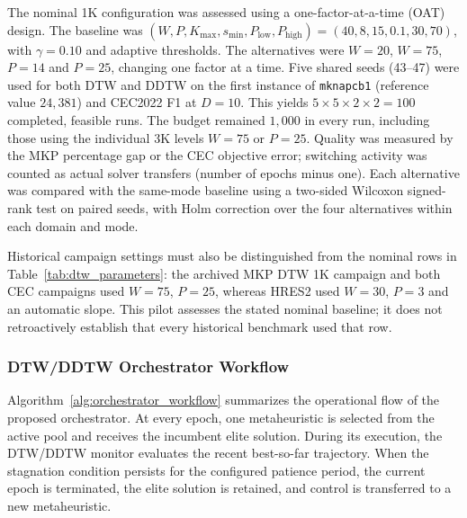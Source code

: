 \documentclass[review]{elsarticle}
\begin{document}
The nominal 1K configuration was assessed using a one-factor-at-a-time
(OAT) design. The baseline was
$(W,P,K_{\max},s_{\min},P_{\mathrm{low}},P_{\mathrm{high}})
=(40,8,15,0.1,30,70)$, with $\gamma=0.10$ and adaptive thresholds.
The alternatives were $W=20$, $W=75$, $P=14$ and $P=25$, changing one
factor at a time. Five shared seeds (43--47) were used for both DTW and
DDTW on the first instance of \texttt{mknapcb1}
(reference value $24{,}381$) and CEC2022 F1 at $D=10$.
This yields $5\times5\times2\times2=100$ completed, feasible runs.
The budget remained $1{,}000$ in every run, including those using the
individual 3K levels $W=75$ or $P=25$.
Quality was measured by the MKP percentage gap or the CEC objective
error; switching activity was counted as actual solver transfers
(number of epochs minus one).
Each alternative was compared with the same-mode baseline using a
two-sided Wilcoxon signed-rank test on paired seeds, with Holm correction
over the four alternatives within each domain and mode.

Historical campaign settings must also be distinguished from the
nominal rows in Table~\ref{tab:dtw_parameters}: the archived MKP DTW
1K campaign and both CEC campaigns used $W=75$, $P=25$, whereas
HRES2 used $W=30$, $P=3$ and an automatic slope.
This pilot assesses the stated nominal baseline; it does not
retroactively establish that every historical benchmark used that row.

\subsubsection{DTW/DDTW Orchestrator Workflow}
\label{sec:orchestrator_workflow}

Algorithm~\ref{alg:orchestrator_workflow} summarizes the operational flow of
the proposed orchestrator. At every epoch, one metaheuristic is selected from
the active pool and receives the incumbent elite solution. During its
execution, the DTW/DDTW monitor evaluates the recent best-so-far trajectory.
When the stagnation condition persists for the configured patience period, the
current epoch is terminated, the elite solution is retained, and control is
transferred to a new metaheuristic.
\end{document}
